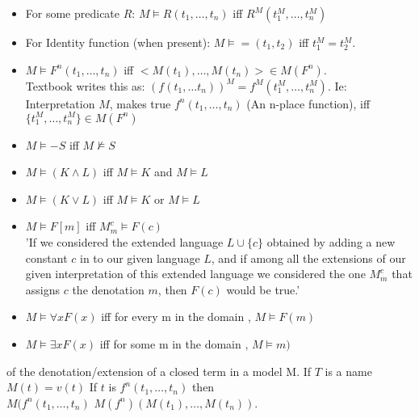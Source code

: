 \begin{definition}[Truth]
\begin{itemize}
\item For some predicate $R$: $M \vDash R(t_1,\dots,t_n)$ iff $R^M(t_1^M,\dots,t_n^M)$ \\
\item For Identity function (when present): $M \vDash =(t_1,t_2)$ iff $t_1^M = t_2^M$.
\item $M \vDash F^n (t_1,\dots,t_n)$ iff $<M(t_1),\dots,M(t_n)> \in M(F^n)$. \\
Textbook writes this as: $(f(t_1, \dots t_n))^M = f^M (t_1^M , \dots, t_n^M)$.
Ie: Interpretation $M$, makes true $f^n(t_1,\dots,t_n)$ (An n-place function), iff $\{t_1^M , \dots, t_n^M\} \in M(F^n)$ %
\item $M \vDash -S $ iff $M \not \vDash S$ %
\item $M \vDash (K \wedge L )$ iff $M \vDash K$ and $M \vDash L$ 
\item $M \vDash (K \vee L )$ iff $M \vDash K$ or $M \vDash L$ %
\item $M \vDash F[m]$ iff $M^c_m \vDash F(c)$ \\
'If we considered the extended language $L \cup \{c\}$ obtained by adding a new constant $c$ in to our given language $L$, and if among all the extensions of our given interpretation of this extended language we considered the one $M^c_m$ that assigns $c$ the denotation $m$, then $F(c)$ would be true.'

\item $M \vDash \forall x F (x) $ iff for every m in the domain , $M \vDash F(m)$
\item $M \vDash \exists x F (x) $ iff for some m in the domain , $M \vDash m)$

\end{itemize}
\end{definition}

\begin{definition}
of the denotation/extension of a closed term in a model M.
If $T$ is a name $M(t) = v(t)$
If $t$ is $f^n(t_1,\dots,t_n)$
then \\
$M(f^n(t_1,\dots,t_n)$
$M(f^n)(M(t_1),\dots,M(t_n)).$
\end{definition}

